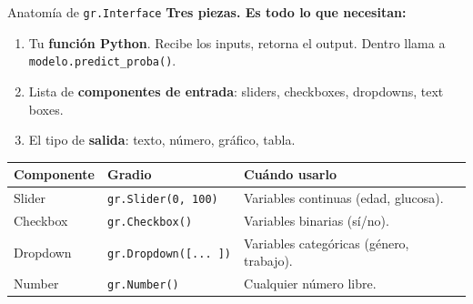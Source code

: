 \documentclass[aspectratio=169, 11pt]{beamer}
\begin{document}
\begin{frame}{Anatomía de \texttt{gr.Interface}}
  \vspace{-4pt}
  {\footnotesize\color{arcaDark}\bfseries
    Tres piezas. Es todo lo que necesitan:}

  \vspace{6pt}
  {\footnotesize
  \begin{enumerate}\setlength{\itemsep}{6pt}
    \item[{\color{arcaRed}\bfseries fn}]
      Tu \textbf{función Python}. Recibe los inputs, retorna el output.
      Dentro llama a \texttt{modelo.predict\_proba()}.
    \item[{\color{arcaRed}\bfseries inputs}]
      Lista de \textbf{componentes de entrada}: sliders, checkboxes,
      dropdowns, text boxes.
    \item[{\color{arcaRed}\bfseries outputs}]
      El tipo de \textbf{salida}: texto, número, gráfico, tabla.
  \end{enumerate}
  }

  \vspace{6pt}
  {\scriptsize
  \begin{tabular}{@{}llp{6cm}@{}}
    \toprule
    \textbf{Componente} & \textbf{Gradio} & \textbf{Cuándo usarlo} \\
    \midrule
    Slider & \texttt{gr.Slider(0, 100)} & Variables continuas (edad, glucosa). \\
    Checkbox & \texttt{gr.Checkbox()} & Variables binarias (sí/no). \\
    Dropdown & \texttt{gr.Dropdown([...~])} & Variables categóricas (género, trabajo). \\
    Number & \texttt{gr.Number()} & Cualquier número libre. \\
    \bottomrule
  \end{tabular}
  }
\end{frame}
\end{document}
